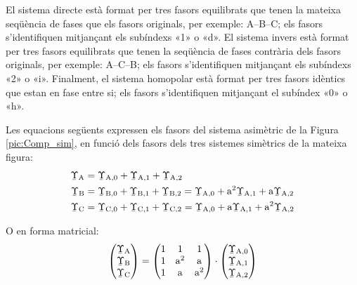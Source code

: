 \begin{center}
    
    \label{pic:Comp_sim}
\end{center}

 
 El sistema directe està format per tres
fasors equilibrats que tenen la mateixa seqüència de fases que els fasors
originals, per exemple: A--B--C; els fasors
s'identifiquen mitjançant els subíndexs «1» o «d». El sistema
invers està format per tres fasors equilibrats que tenen la seqüència de fases contrària
 dels fasors originals, per exemple: A--C--B; els fasors s'identifiquen mitjançant els
subíndexs «2» o «i». Finalment, el sistema homopolar està
format per tres fasors idèntics que estan en fase entre si; els fasors 
s'identifiquen mitjançant el subíndex «0» o «h».

Les equacions següents expressen els fasors del sistema asimètric de la Figura \vref{pic:Comp_sim}, en funció
dels fasors dels tres sistemes simètrics de la mateixa figura:
\begin{subequations}
\begin{align}
   \cmplx{\Upsilon}\ped{A} &= \cmplx{\Upsilon}\ped{A,0}  +
   \cmplx{\Upsilon}\ped{A,1} + \cmplx{\Upsilon}\ped{A,2} \label{eq:c_sim_a}\\
   \cmplx{\Upsilon}\ped{B} &= \cmplx{\Upsilon}\ped{B,0} + \cmplx{\Upsilon}\ped{B,1} +
   \cmplx{\Upsilon}\ped{B,2}  =  \cmplx{\Upsilon}\ped{A,0} + \au^2
   \cmplx{\Upsilon}\ped{A,1} + \au \cmplx{\Upsilon}\ped{A,2} \label{eq:c_sim_b}\\
   \cmplx{\Upsilon}\ped{C} &= \cmplx{\Upsilon}\ped{C,0} + \cmplx{\Upsilon}\ped{C,1} +
   \cmplx{\Upsilon}\ped{C,2}  = \cmplx{\Upsilon}\ped{A,0} + \au
   \cmplx{\Upsilon}\ped{A,1} + \au^2 \cmplx{\Upsilon}\ped{A,2} \label{eq:c_sim_c}
\end{align}
\end{subequations}

O en forma matricial:
\begin{equation}\label{eq:c_sim_mat}
   \begin{pmatrix}
     \cmplx{\Upsilon}\ped{A} \\
     \cmplx{\Upsilon}\ped{B} \\
     \cmplx{\Upsilon}\ped{C}
   \end{pmatrix} =
   \begin{pmatrix}
     1 & 1 & 1 \\
     1 & \au^2 & \au\\
     1 & \au & \au^2
   \end{pmatrix} \cdot
   \begin{pmatrix}
     \cmplx{\Upsilon}\ped{A,0} \\
     \cmplx{\Upsilon}\ped{A,1} \\
     \cmplx{\Upsilon}\ped{A,2}
   \end{pmatrix}
\end{equation}

